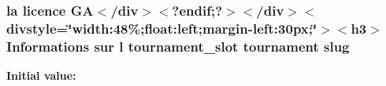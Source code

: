 \hypertarget{backend_2modules_2ipn_2templates_2view_success_8php_a2b7d6694be020169de3a660b1b93a40d}{
\subsubsection[{slug}]{\setlength{\rightskip}{0pt plus 5cm}la licence G\-A$<$/div$>$$<$?{\bf endif};?$>$$<$/div$>$$<$divstyle=\char`\"{}width\-:48\%;float\-:left;margin-\/left\-:30px;\char`\"{}$>$$<$h3$>$ Informations sur l tournament\-\_\-slot tournament slug}}\label{backend_2modules_2ipn_2templates_2view_success_8php_a2b7d6694be020169de3a660b1b93a40d}
{\bfseries Initial value\-:}
